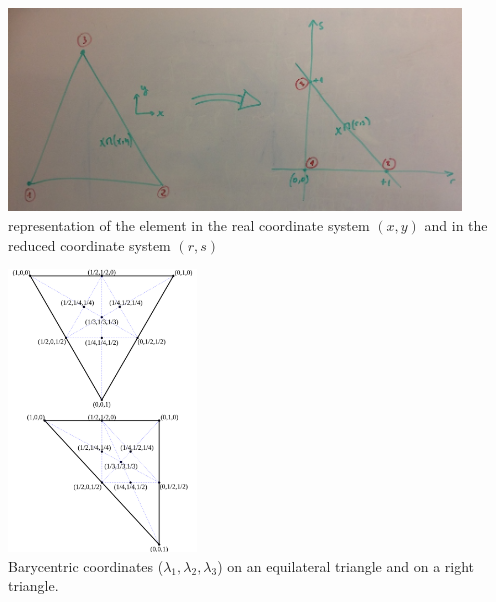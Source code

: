 \begin{center}
\includegraphics[width=12cm]{images/mini/minielement2}\\
{\small representation of the element in the real coordinate system $(x,y)$
and in the reduced coordinate system $(r,s)$}
\end{center}

\begin{center}
\includegraphics[width=5cm]{images/mini/barycoord}\\
{\small Barycentric coordinates ($\lambda _{1},\lambda _{2},\lambda _{3}$) on an equilateral triangle and on a right triangle.}
\end{center}

